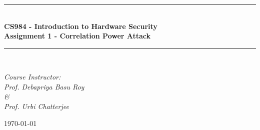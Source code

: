 \documentclass[12pt, letterpaper, oneside]{report}
\begin{document}
\begin{titlepage}

\newcommand{\HRule}{\rule{\linewidth}{0.5mm}} %

\center %
 




\HRule \\[0.8cm]
{ \huge \bfseries CS984 - Introduction to Hardware Security }\\[0.4cm] %
{ \large \bfseries Assignment 1 - Correlation Power Attack}\\[0.2cm]
\HRule \\[1.5cm]
 

\begin{minipage}{0.8\textwidth}
\begin{center} \large
\emph{Course Instructor: \\ Prof. Debapriya Basu Roy \\ \&\\  Prof. Urbi Chatterjee}



\end{center}

\begin{center}
\today
\end{center}

\end{minipage}



\end{titlepage}
\end{document}
